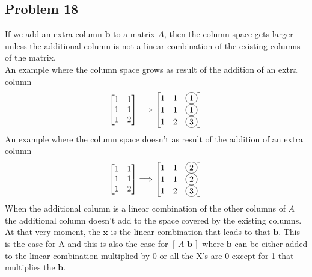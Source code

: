 \documentclass[a4paper,11pt]{article}
\newcommand*\circled[1]{\tikz[baseline=(char.base)]{
             \node[shape=circle,draw,inner sep=2pt] (char) {#1};}}
\newcommand{\mybf}[1]{\boldsymbol{#1}}
\begin{document}
\subsection*{Problem 18}
If we add an extra column $\mybf{b}$ to a matrix $A$, then the column space gets larger unless the additional column is not a linear combination of the existing columns of the matrix. \\
An example where the column space grows as result of the addition of an extra column
\begin{align}
\begin{bmatrix}
1 & 1\\
1 & 1\\
1 & 2\\
\end{bmatrix}
\Longrightarrow
\begin{bmatrix}
1 & 1 & \circled{1} \\
1 & 1 & \circled{1} \\
1 & 2 & \circled{3} \\
\end{bmatrix}
\end{align}
An example where the column space doesn't as result of the addition of an extra column
\begin{align}
\begin{bmatrix}
1 & 1\\
1 & 1\\
1 & 2\\
\end{bmatrix}
\Longrightarrow
\begin{bmatrix}
1 & 1 & \circled{2} \\
1 & 1 & \circled{2} \\
1 & 2 & \circled{3} \\
\end{bmatrix}
\end{align}
When the additional column is a linear combination of the other columns of $A$  the additional column doesn't add to the space covered by the existing columns. At that very moment, the $\mybf{x}$ is the linear combination that leads to that $\mybf{b}$. This is the case for A and this is also the case for $[\,A \,\, \mybf{b}\,]$ where $\mybf{b}$ can be either added to the linear combination multiplied by 0 or all the X's are 0 except for 1 that multiplies the $\mybf{b}$.
\end{document}
